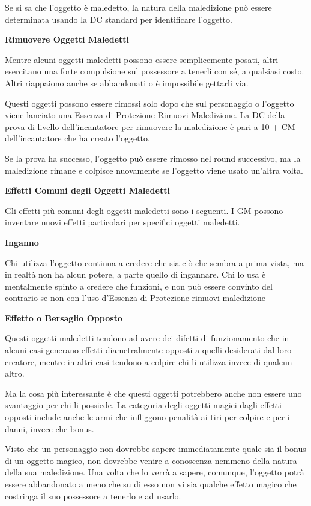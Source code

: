 \documentclass[a4paper,11pt,twoside,openany]{book}
\begin{document}
Se si sa che l'oggetto è maledetto, la natura della maledizione può essere determinata usando la DC standard per identificare l'oggetto.

\textbf{Rimuovere Oggetti Maledetti}

Mentre alcuni oggetti maledetti possono essere semplicemente posati, altri esercitano una forte compulsione sul possessore a tenerli con sé, a qualsiasi costo. Altri riappaiono anche se abbandonati o è impossibile gettarli via.

Questi oggetti possono essere rimossi solo dopo che sul personaggio o l'oggetto viene lanciato una Essenza di Protezione Rimuovi Maledizione. La DC della prova di livello dell'incantatore per rimuovere la maledizione è pari a 10 + CM dell'incantatore che ha creato l'oggetto.

Se la prova ha successo, l'oggetto può essere rimosso nel round successivo, ma la maledizione rimane e colpisce nuovamente se l'oggetto viene usato un'altra volta.

\textbf{Effetti Comuni degli Oggetti Maledetti}

Gli effetti più comuni degli oggetti maledetti sono i seguenti. I GM possono inventare nuovi effetti particolari per specifici oggetti maledetti.

\textbf{Inganno}

Chi utilizza l'oggetto continua a credere che sia ciò che sembra a prima vista, ma in realtà non ha alcun potere, a parte quello di ingannare. Chi lo usa è mentalmente spinto a credere che funzioni, e non può essere convinto del contrario se non con l'uso d'Essenza di Protezione rimuovi maledizione

\textbf{Effetto o Bersaglio Opposto}

Questi oggetti maledetti tendono ad avere dei difetti di funzionamento che in alcuni casi generano effetti diametralmente opposti a quelli desiderati dal loro creatore, mentre in altri casi tendono a colpire chi li utilizza invece di qualcun altro.

Ma la cosa più interessante è che questi oggetti potrebbero anche non essere uno svantaggio per chi li possiede. La categoria degli oggetti magici dagli effetti opposti include anche le armi che infliggono penalità ai tiri per colpire e per i danni, invece che bonus.

Visto che un personaggio non dovrebbe sapere immediatamente quale sia il bonus di un oggetto magico, non dovrebbe venire a conoscenza nemmeno della natura della sua maledizione. Una volta che lo verrà a sapere, comunque, l'oggetto potrà essere abbandonato a meno che su di esso non vi sia qualche effetto magico che costringa il suo possessore a tenerlo e ad usarlo.
\end{document}

